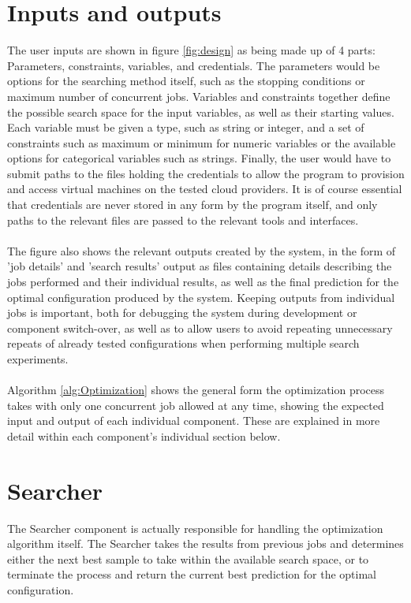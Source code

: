 \documentclass{report}
\begin{document}
\section{Inputs and outputs}
The user inputs are shown in figure \ref{fig:design} as being made up of 4 parts: Parameters, constraints, variables, and credentials. The parameters would be options for the searching method itself, such as the stopping conditions or maximum number of concurrent jobs. Variables and constraints together define the possible search space for the input variables, as well as their starting values. Each variable must be given a type, such as string or integer, and a set of constraints such as maximum or minimum for numeric variables or the available options for categorical variables such as strings. Finally, the user would have to submit paths to the files holding the credentials to allow the program to provision and access virtual machines on the tested cloud providers. It is of course essential that credentials are never stored in any form by the program itself, and only paths to the relevant files are passed to the relevant tools and interfaces.
\paragraph{}
The figure also shows the relevant outputs created by the system, in the form of 'job details' and 'search results' output as files containing details describing the jobs performed and their individual results, as well as the final prediction for the optimal configuration produced by the system. Keeping outputs from individual jobs is important, both for debugging the system during development or component switch-over, as well as to allow users to avoid repeating unnecessary repeats of already tested configurations when performing multiple search experiments.
\paragraph{}
Algorithm \ref{alg:Optimization} shows the general form the optimization process takes with only one concurrent job allowed at any time, showing the expected input and output of each individual component. These are explained in more detail within each component's individual section below.

\section{Searcher}
The Searcher component is actually responsible for handling the optimization algorithm itself. The Searcher takes the results from previous jobs and determines either the next best sample to take within the available search space, or to terminate the process and return the current best prediction for the optimal configuration. 
\end{document}
